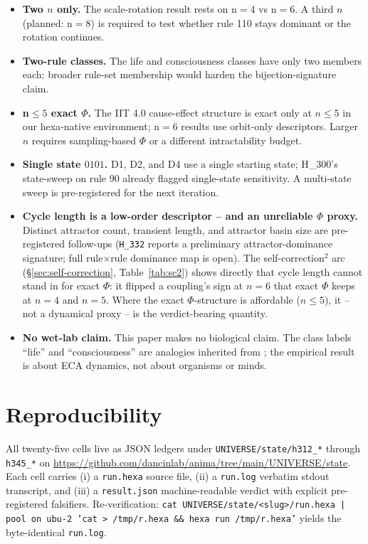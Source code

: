 \documentclass[11pt,a4paper]{article}
\begin{document}
\begin{itemize}\itemsep0.2em
\item \textbf{Two $n$ only.} The scale-rotation result rests on n$=$4
      vs n$=$6. A third $n$ (planned: n$=$8) is required to test
      whether rule 110 stays dominant or the rotation continues.
\item \textbf{Two-rule classes.} The life and consciousness classes
      have only two members each; broader rule-set membership would
      harden the bijection-signature claim.
\item \textbf{n$\leq 5$ exact $\Phi$.} The IIT 4.0 cause-effect
      structure is exact only at $n \leq 5$ in our hexa-native
      environment; n$=$6 results use orbit-only descriptors. Larger
      $n$ requires sampling-based $\Phi$ \citep{albantakis2023iit4} or
      a different intractability budget.
\item \textbf{Single state $0101$.} D1, D2, and D4 use a single
      starting state; H\_300's state-sweep on rule 90 already
      flagged single-state sensitivity. A multi-state sweep is
      pre-registered for the next iteration.
\item \textbf{Cycle length is a low-order descriptor -- and an
      unreliable $\Phi$ proxy.} Distinct attractor count, transient
      length, and attractor basin size are pre-registered follow-ups
      (\texttt{H\_332} reports a preliminary attractor-dominance
      signature; full rule$\times$rule dominance map is open). The
      self-correction$^2$ arc (\S\ref{sec:self-correction},
      Table~\ref{tab:sc2}) shows directly that cycle length cannot
      stand in for exact $\Phi$: it flipped a coupling's sign at $n=6$
      that exact $\Phi$ keeps at $n=4$ and $n=5$. Where the exact
      $\Phi$-structure is affordable ($n\leq 5$), it -- not a dynamical
      proxy -- is the verdict-bearing quantity.
\item \textbf{No wet-lab claim.} This paper makes no biological
      claim. The class labels ``life'' and ``consciousness'' are
      analogies inherited from \citep{anima_H287}; the empirical
      result is about ECA dynamics, not about organisms or minds.
\end{itemize}

\section{Reproducibility}
\label{sec:repro}

All twenty-five cells live as JSON ledgers under
\texttt{UNIVERSE/state/h312\_*} through
\texttt{h345\_*} on
\url{https://github.com/dancinlab/anima/tree/main/UNIVERSE/state}.
Each cell carries (i) a \texttt{run.hexa} source file, (ii) a
\texttt{run.log} verbatim stdout transcript, and (iii) a
\texttt{result.json} machine-readable verdict with explicit
pre-registered falsifiers. Re-verification:
\texttt{cat UNIVERSE/state/<slug>/run.hexa | pool on ubu-2 'cat
> /tmp/r.hexa \&\& hexa run /tmp/r.hexa'}
yields the byte-identical \texttt{run.log}.
\end{document}
